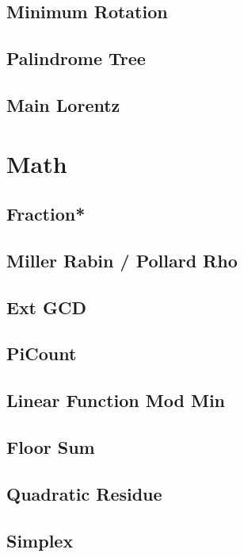 \subsection{Minimum Rotation}

\subsection{Palindrome Tree}

\subsection{Main Lorentz}


\section{Math}
\subsection{Fraction*}

\subsection{Miller Rabin / Pollard Rho}

\subsection{Ext GCD}

\subsection{PiCount}

\subsection{Linear Function Mod Min}

\subsection{Floor Sum}

\subsection{Quadratic Residue}

\subsection{Simplex}

